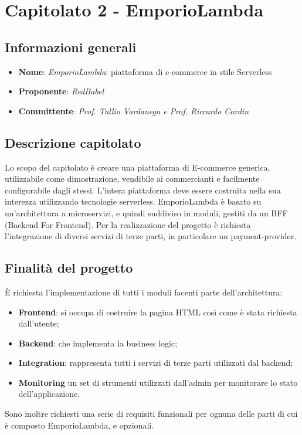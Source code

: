 \section{Capitolato 2 - EmporioLambda}
\subsection{Informazioni generali}
\begin{itemize}
    \item \textbf{Nome}: \emph{EmporioLambda}: piattaforma di e-commerce in stile Serverless
    \item \textbf{Proponente}: \emph{RedBabel}
    \item \textbf{Committente}: \emph{Prof. Tullio Vardanega e Prof. Riccardo Cardin}
\end{itemize}
\subsection{Descrizione capitolato}
Lo scopo del capitolato è creare una piattaforma di E-commerce generica, utilizzabile come dimostrazione, vendibile ai commercianti e facilmente configurabile dagli stessi. L'intera piattaforma deve essere costruita nella sua interezza utilizzando tecnologie serverless. EmporioLambda è basato su un'architettura a microservizi, e quindi suddiviso in moduli, gestiti da un BFF (Backend For Frontend). Per la realizzazione del progetto è richiesta l'integrazione di diversi servizi di terze parti, in particolare un payment-provider.
\subsection{Finalità del progetto}
È richiesta l'implementazione di tutti i moduli facenti parte dell'architettura:
\begin{itemize}
	\item \textbf{Frontend}: si occupa di costruire la pagina HTML così come è stata richiesta dall'utente;
	\item \textbf{Backend}: che implementa la business logic;
	\item \textbf{Integration}: rappresenta tutti i servizi di terze parti utilizzati dal backend;
	\item \textbf{Monitoring} un set di strumenti utilizzati dall'admin per monitorare lo stato dell'applicazione.
\end{itemize}
Sono inoltre richiesti una serie di requisiti funzionali per ognuna delle parti di cui è composto EmporioLambda, e opzionali.
